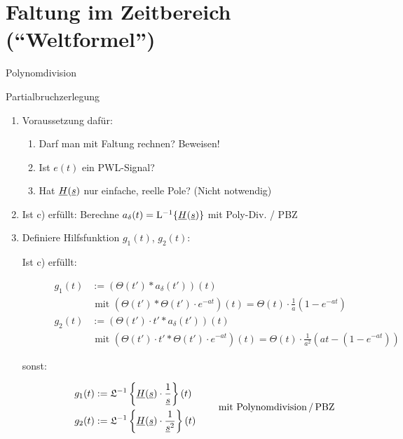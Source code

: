 \chapter{Faltung im Zeitbereich ("`Weltformel"')}

\begin{skills}
  \item Polynomdivision
  \item Partialbruchzerlegung
\end{skills}


\begin{enumerate}
  \item Voraussetzung dafür:
    \begin{enumerate}
      \item Darf man mit Faltung rechnen? Beweisen!
      \item Ist $e(t)$ ein \acs{PWL}-Signal?
      \item Hat $\underline{H}(\underline{s})$ nur einfache, reelle Pole? (Nicht notwendig)
    \end{enumerate}

  \item Ist c) erfüllt: Berechne $a_\delta(t) = \mathrm{L}^{-1}\{\underline{H}(\underline{s})\}$
    mit Poly-Div. / PBZ

  \item Definiere Hilfsfunktion $g_1(t)$, $g_2(t)$:
    \begin{description}
      \item[Ist c) erfüllt:]
        \begin{align*}
          g_1(t) &:= \left(\Theta(t')\ast a_\delta(t')\right)(t)\\
            & \text{ mit } (\Theta(t')\ast\Theta(t')\cdot e^{-at})(t)
            = \Theta(t)\cdot\frac{1}{a} \left(1-e^{-at}\right)\\
          g_2(t) &:= \left(\Theta(t')\cdot t'\ast a_\delta(t')\right)(t)\\
            & \text{ mit } (\Theta(t')\cdot t'\ast\Theta(t')\cdot e^{-at})(t)
            = \Theta(t)\cdot\frac{1}{a^2} \left(at-(1- e^{-at})\right)
        \end{align*}
      \item[sonst:]
        \[
        \begin{aligned}
          g_1(t) &:= \mathfrak{L}^{-1}\left\{\underline{H}(\underline{s})
            \cdot \frac{1}{\underline{s}}\right\}(t)\\
          g_2(t) &:= \mathfrak{L}^{-1}\left\{\underline{H}(\underline{s})
            \cdot \frac{1}{\underline{s}^2}\right\}(t)
        \end{aligned}
        \qquad
        \text{ mit Polynomdivision\,/\,PBZ}
        \]
    \end{description}


\end{enumerate}
